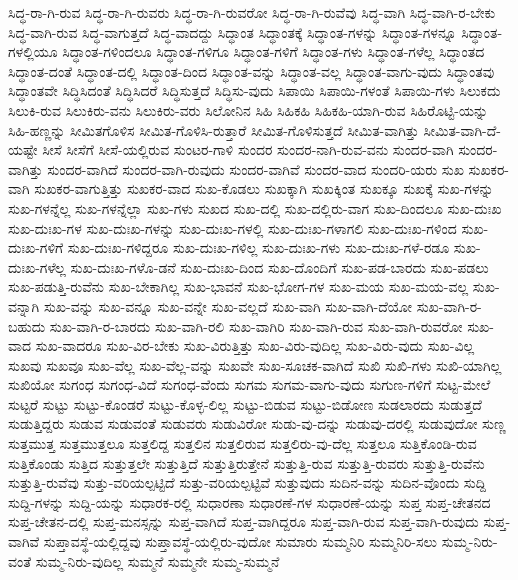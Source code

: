 {ಸಿದ್ಧ-ರಾ-ಗಿ-ರುವ
ಸಿದ್ಧ-ರಾ-ಗಿ-ರುವರು
ಸಿದ್ಧ-ರಾ-ಗಿ-ರುವರೋ
ಸಿದ್ಧ-ರಾ-ಗಿ-ರುವೆವು
ಸಿದ್ಧ-ವಾಗಿ
ಸಿದ್ಧ-ವಾಗಿ-ರ-ಬೇಕು
ಸಿದ್ಧ-ವಾಗಿ-ರುವ
ಸಿದ್ಧ-ವಾಗುತ್ತದೆ
ಸಿದ್ಧ-ವಾದದ್ದು
ಸಿದ್ಧಾಂತ
ಸಿದ್ಧಾಂತಕ್ಕೆ
ಸಿದ್ಧಾಂತ-ಗಳನ್ನು
ಸಿದ್ಧಾಂತ-ಗಳನ್ನೂ
ಸಿದ್ಧಾಂತ-ಗಳಲ್ಲಿಯೂ
ಸಿದ್ಧಾಂತ-ಗಳಿಂದಲೂ
ಸಿದ್ಧಾಂತ-ಗಳಿಗೂ
ಸಿದ್ಧಾಂತ-ಗಳಿಗೆ
ಸಿದ್ಧಾಂತ-ಗಳು
ಸಿದ್ಧಾಂತ-ಗಳೆಲ್ಲ
ಸಿದ್ಧಾಂತದ
ಸಿದ್ಧಾಂತ-ದಂತೆ
ಸಿದ್ಧಾಂತ-ದಲ್ಲಿ
ಸಿದ್ಧಾಂತ-ದಿಂದ
ಸಿದ್ಧಾಂತ-ವನ್ನು
ಸಿದ್ಧಾಂತ-ವಲ್ಲ
ಸಿದ್ಧಾಂತ-ವಾಗು-ವುದು
ಸಿದ್ಧಾಂತವು
ಸಿದ್ಧಾಂತವೇ
ಸಿದ್ಧಿಸಿದಂತೆ
ಸಿದ್ಧಿಸಿದರೆ
ಸಿದ್ಧಿಸುತ್ತದೆ
ಸಿದ್ಧಿಸು-ವುದು
ಸಿಪಾಯಿ
ಸಿಪಾಯಿ-ಗಳಂತೆ
ಸಿಪಾಯಿ-ಗಳು
ಸಿಲುಕದು
ಸಿಲುಕಿ-ರುವ
ಸಿಲುಕಿರು-ವನು
ಸಿಲುಕಿರು-ವರು
ಸಿಲೋನಿನ
ಸಿಹಿ
ಸಿಹಿಕಹಿ
ಸಿಹಿಕಹಿ-ಯಾಗಿ-ರುವ
ಸಿಹಿರೊಟ್ಟಿ-ಯನ್ನು
ಸಿಹಿ-ಹಣ್ಣನ್ನು
ಸೀಮಿತಗೊಳಿಸ
ಸೀಮಿತ-ಗೊಳಿಸಿ-ರುತ್ತಾರೆ
ಸೀಮಿತ-ಗೊಳಿಸುತ್ತದೆ
ಸೀಮಿತ-ವಾಗಿತ್ತು
ಸೀಮಿತ-ವಾಗಿ-ದೆ-ಯಷ್ಟೇ
ಸೀಸೆ
ಸೀಸೆಗೆ
ಸೀಸೆ-ಯಲ್ಲಿರುವ
ಸುಂಟರ-ಗಾಳಿ
ಸುಂದರ
ಸುಂದರ-ನಾಗಿ-ರುವ-ವನು
ಸುಂದರ-ವಾಗಿ
ಸುಂದರ-ವಾಗಿತ್ತು
ಸುಂದರ-ವಾಗಿದೆ
ಸುಂದರ-ವಾಗಿ-ರುವುದು
ಸುಂದರ-ವಾಗಿವೆ
ಸುಂದರ-ವಾದ
ಸುಂದರಿ-ಯರು
ಸುಖ
ಸುಖಕರ-ವಾಗಿ
ಸುಖಕರ-ವಾಗುತ್ತಿತ್ತು
ಸುಖಕರ-ವಾದ
ಸುಖ-ಕೊಡಲು
ಸುಖಕ್ಕಾಗಿ
ಸುಖಕ್ಕಿಂತ
ಸುಖಕ್ಕೂ
ಸುಖಕ್ಕೆ
ಸುಖ-ಗಳನ್ನು
ಸುಖ-ಗಳನ್ನೆಲ್ಲ
ಸುಖ-ಗಳನ್ನೆಲ್ಲಾ
ಸುಖ-ಗಳು
ಸುಖದ
ಸುಖ-ದಲ್ಲಿ
ಸುಖ-ದಲ್ಲಿರು-ವಾಗ
ಸುಖ-ದಿಂದಲೂ
ಸುಖ-ದುಃಖ
ಸುಖ-ದುಃಖ-ಗಳ
ಸುಖ-ದುಃಖ-ಗಳನ್ನು
ಸುಖ-ದುಃಖ-ಗಳಲ್ಲಿ
ಸುಖ-ದುಃಖ-ಗಳಾಗಲಿ
ಸುಖ-ದುಃಖ-ಗಳಿಂದ
ಸುಖ-ದುಃಖ-ಗಳಿಗೆ
ಸುಖ-ದುಃಖ-ಗಳಿದ್ದರೂ
ಸುಖ-ದುಃಖ-ಗಳಿಲ್ಲ
ಸುಖ-ದುಃಖ-ಗಳು
ಸುಖ-ದುಃಖ-ಗಳೆ-ರಡೂ
ಸುಖ-ದುಃಖ-ಗಳೆಲ್ಲ
ಸುಖ-ದುಃಖ-ಗಳೊ-ಡನೆ
ಸುಖ-ದುಃಖ-ದಿಂದ
ಸುಖ-ದೊಂದಿಗೆ
ಸುಖ-ಪಡ-ಬಾರದು
ಸುಖ-ಪಡಲು
ಸುಖ-ಪಡುತ್ತಿ-ರುವೆನು
ಸುಖ-ಬೇಕಾಗಿಲ್ಲ
ಸುಖ-ಭಾವನೆ
ಸುಖ-ಭೋಗ-ಗಳ
ಸುಖ-ಮಯ
ಸುಖ-ಮಯ-ವಲ್ಲ
ಸುಖ-ವನ್ನಾಗಿ
ಸುಖ-ವನ್ನು
ಸುಖ-ವನ್ನೂ
ಸುಖ-ವನ್ನೇ
ಸುಖ-ವಲ್ಲದೆ
ಸುಖ-ವಾಗಿ
ಸುಖ-ವಾಗಿ-ದೆಯೋ
ಸುಖ-ವಾಗಿ-ರ-ಬಹುದು
ಸುಖ-ವಾಗಿ-ರ-ಬಾರದು
ಸುಖ-ವಾಗಿ-ರಲಿ
ಸುಖ-ವಾಗಿರಿ
ಸುಖ-ವಾಗಿ-ರುವ
ಸುಖ-ವಾಗಿ-ರುವರೋ
ಸುಖ-ವಾದ
ಸುಖ-ವಾದರೂ
ಸುಖ-ವಿರ-ಬೇಕು
ಸುಖ-ವಿರುತ್ತಿತ್ತು
ಸುಖ-ವಿರು-ವುದಿಲ್ಲ
ಸುಖ-ವಿರು-ವುದು
ಸುಖ-ವಿಲ್ಲ
ಸುಖವು
ಸುಖವೂ
ಸುಖ-ವೆಲ್ಲ
ಸುಖ-ವೆಲ್ಲ-ವನ್ನು
ಸುಖವೇ
ಸುಖ-ಸೂಚಕ-ವಾಗಿದೆ
ಸುಖಿ
ಸುಖಿ-ಗಳು
ಸುಖಿ-ಯಾಗಿಲ್ಲ
ಸುಖಿಯೋ
ಸುಗಂಧ
ಸುಗಂಧ-ವಿದೆ
ಸುಗಂಧ-ವೆಂದು
ಸುಗಮ
ಸುಗಮ-ವಾಗು-ವುದು
ಸುಗುಣ-ಗಳಿಗೆ
ಸುಟ್ಟ-ಮೇಲೆ
ಸುಟ್ಟರೆ
ಸುಟ್ಟು
ಸುಟ್ಟು-ಕೊಂಡರೆ
ಸುಟ್ಟು-ಕೊಳ್ಳ-ಲಿಲ್ಲ
ಸುಟ್ಟು-ಬಿಡುವ
ಸುಟ್ಟು-ಬಿಡೋಣ
ಸುಡಲಾರದು
ಸುಡುತ್ತದೆ
ಸುಡುತ್ತಿದ್ದರು
ಸುಡುವ
ಸುಡುವಂತೆ
ಸುಡುವರು
ಸುಡುವಿರೋ
ಸುಡು-ವು-ದನ್ನು
ಸುಡುವು-ದರಲ್ಲಿ
ಸುಡುವುದೋ
ಸುಣ್ಣ
ಸುತ್ತಮುತ್ತ
ಸುತ್ತಮುತ್ತಲೂ
ಸುತ್ತಲಿದ್ದ
ಸುತ್ತಲಿನ
ಸುತ್ತಲಿರುವ
ಸುತ್ತಲಿರು-ವು-ದೆಲ್ಲ
ಸುತ್ತಲೂ
ಸುತ್ತಿಕೊಂಡಿ-ರುವ
ಸುತ್ತಿಕೊಂಡು
ಸುತ್ತಿದ
ಸುತ್ತುತ್ತಲೇ
ಸುತ್ತುತ್ತಿದೆ
ಸುತ್ತುತ್ತಿರುತ್ತೇನೆ
ಸುತ್ತುತ್ತಿ-ರುವ
ಸುತ್ತುತ್ತಿ-ರುವರು
ಸುತ್ತುತ್ತಿ-ರುವೆನು
ಸುತ್ತುತ್ತಿ-ರುವೆವು
ಸುತ್ತು-ವರಿಯಲ್ಪಟ್ಟಿದೆ
ಸುತ್ತು-ವರಿಯಲ್ಪಟ್ಟಿವೆ
ಸುತ್ತುವುದು
ಸುದಿನ-ವನ್ನು
ಸುದಿನ-ವೊಂದು
ಸುದ್ದಿ
ಸುದ್ದಿ-ಗಳನ್ನು
ಸುದ್ದಿ-ಯನ್ನು
ಸುಧಾರಕ-ರಲ್ಲಿ
ಸುಧಾರಣಾ
ಸುಧಾರಣೆ-ಗಳ
ಸುಧಾರಣೆ-ಯನ್ನು
ಸುಪ್ತ
ಸುಪ್ತ-ಚೇತನದ
ಸುಪ್ತ-ಚೇತನ-ದಲ್ಲಿ
ಸುಪ್ತ-ಮನಸ್ಸನ್ನು
ಸುಪ್ತ-ವಾಗಿದೆ
ಸುಪ್ತ-ವಾಗಿದ್ದರೂ
ಸುಪ್ತ-ವಾಗಿ-ರುವ
ಸುಪ್ತ-ವಾಗಿ-ರುವುದು
ಸುಪ್ತ-ವಾಗಿವೆ
ಸುಪ್ತಾವಸ್ಥೆ-ಯಲ್ಲಿದ್ದವು
ಸುಪ್ತಾವಸ್ಥೆ-ಯಲ್ಲಿರು-ವುದೋ
ಸುಮಾರು
ಸುಮ್ಮನಿರಿ
ಸುಮ್ಮನಿರಿ-ಸಲು
ಸುಮ್ಮ-ನಿರು-ವಂತೆ
ಸುಮ್ಮ-ನಿರು-ವುದಿಲ್ಲ
ಸುಮ್ಮನೆ
ಸುಮ್ಮನೇ
ಸುಮ್ಮ-ಸುಮ್ಮನೆ
}
